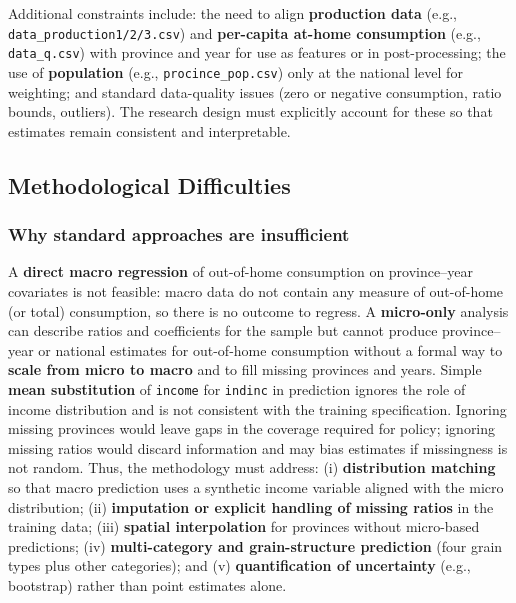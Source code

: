 Additional constraints include: the need to align \textbf{production data} (e.g., \texttt{data\_production1/2/3.csv}) and \textbf{per-capita at-home consumption} (e.g., \texttt{data\_q.csv}) with province and year for use as features or in post-processing; the use of \textbf{population} (e.g., \texttt{procince\_pop.csv}) only at the national level for weighting; and standard data-quality issues (zero or negative consumption, ratio bounds, outliers). The research design must explicitly account for these so that estimates remain consistent and interpretable.

\subsection{Methodological Difficulties}
\label{subsec:methodological-difficulties}

\subsubsection{Why standard approaches are insufficient}
\label{subsec:why-standard-insufficient}

A \textbf{direct macro regression} of out-of-home consumption on province--year covariates is not feasible: macro data do not contain any measure of out-of-home (or total) consumption, so there is no outcome to regress. A \textbf{micro-only} analysis can describe ratios and coefficients for the sample but cannot produce province--year or national estimates for out-of-home consumption without a formal way to \textbf{scale from micro to macro} and to fill missing provinces and years. Simple \textbf{mean substitution} of \texttt{income} for \texttt{indinc} in prediction ignores the role of income distribution and is not consistent with the training specification. Ignoring missing provinces would leave gaps in the coverage required for policy; ignoring missing ratios would discard information and may bias estimates if missingness is not random. Thus, the methodology must address: (i) \textbf{distribution matching} so that macro prediction uses a synthetic income variable aligned with the micro distribution; (ii) \textbf{imputation or explicit handling of missing ratios} in the training data; (iii) \textbf{spatial interpolation} for provinces without micro-based predictions; (iv) \textbf{multi-category and grain-structure prediction} (four grain types plus other categories); and (v) \textbf{quantification of uncertainty} (e.g., bootstrap) rather than point estimates alone.

